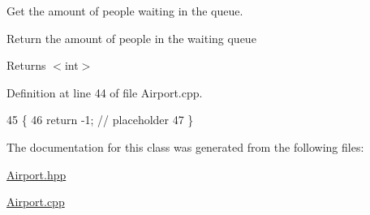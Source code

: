 Get the amount of people waiting in the queue. 

Return the amount of people in the waiting queue

\begin{DoxyReturn}{Returns}
$<$int$>$ 
\end{DoxyReturn}


Definition at line 44 of file Airport.\+cpp.


\begin{DoxyCode}
45 \{
46     \textcolor{keywordflow}{return} -1; \textcolor{comment}{// placeholder}
47 \}
\end{DoxyCode}


The documentation for this class was generated from the following files\+:\begin{DoxyCompactItemize}
\item 
\hyperlink{Airport_8hpp}{Airport.\+hpp}\item 
\hyperlink{Airport_8cpp}{Airport.\+cpp}\end{DoxyCompactItemize}
